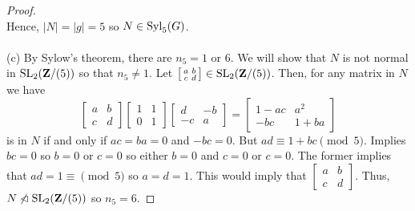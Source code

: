 \begin{proof}
\[\]
Hence, $|N|=|g|=5$ so $N\in\operatorname{Syl}_5(G)$.
\\\\
(c) By Sylow's theorem, there are $n_5=1$ or $6$. We will show that $N$ is
not normal in $\operatorname{SL}_2(\mathbf{Z}/(5))$ so that $n_5\neq 1$. Let
$\left[\begin{smallmatrix}a&b\\c&d\end{smallmatrix}\right]\in\operatorname{SL}_2(\mathbf{Z}/(5))$. Then,
for any matrix in $N$ we have
\[
\begin{bmatrix}
a&b\\c&d
\end{bmatrix}
\begin{bmatrix}
1&1\\0&1
\end{bmatrix}
\begin{bmatrix}
d&-b\\
-c&a
\end{bmatrix}
=
\begin{bmatrix}
1-ac&a^2\\-bc&1+ba
\end{bmatrix}
\]
is in $N$ if and only if $ac=ba=0$ and $-bc=0$. But $ad\equiv
1+bc\pmod{5}$. Implies $bc=0$ so $b=0$ or $c=0$ so either $b=0$ and $c=0$
or $c=0$. The former implies that $ad=1\equiv\pmod{5}$ so $a=d=1$. This
would imply that
$\left[\begin{smallmatrix}a&b\\c&d\end{smallmatrix}\right]$. Thus,
$N\nlhd\SL_2(\bfZ/(5))$ so $n_5=6$.
\end{proof}

